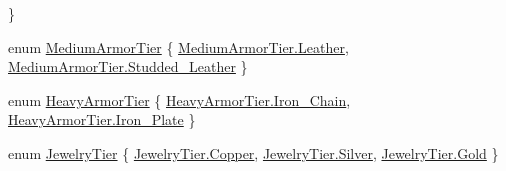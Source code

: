 \begin{DoxyCompactItemize}
 \}
\item 
enum \mbox{\hyperlink{class_base_item_a920c9e47e5258c5bac64842ce8997cb0}{Medium\+Armor\+Tier}} \{ \mbox{\hyperlink{class_base_item_a920c9e47e5258c5bac64842ce8997cb0abdf7ad23e89b55f904bca0304819309e}{Medium\+Armor\+Tier.\+Leather}}, 
\mbox{\hyperlink{class_base_item_a920c9e47e5258c5bac64842ce8997cb0a34833b9352f8ebeef7960b067a6ee001}{Medium\+Armor\+Tier.\+Studded\+\_\+\+Leather}}
 \}
\item 
enum \mbox{\hyperlink{class_base_item_a3d8a039ad76206fc6622908254923b42}{Heavy\+Armor\+Tier}} \{ \mbox{\hyperlink{class_base_item_a3d8a039ad76206fc6622908254923b42ae68b72466d3a9a25070f08e85b67e59d}{Heavy\+Armor\+Tier.\+Iron\+\_\+\+Chain}}, 
\mbox{\hyperlink{class_base_item_a3d8a039ad76206fc6622908254923b42abc164f0b4e865398d61a9bed45eada53}{Heavy\+Armor\+Tier.\+Iron\+\_\+\+Plate}}
 \}
\item 
enum \mbox{\hyperlink{class_base_item_a1c4562ea0ee40255c44724fefee47ad7}{Jewelry\+Tier}} \{ \mbox{\hyperlink{class_base_item_a1c4562ea0ee40255c44724fefee47ad7aa4090ffabdfba53d76b0748a0d87ce21}{Jewelry\+Tier.\+Copper}}, 
\mbox{\hyperlink{class_base_item_a1c4562ea0ee40255c44724fefee47ad7af96e345fdc19cbd4cf15256c251a39a0}{Jewelry\+Tier.\+Silver}}, 
\mbox{\hyperlink{class_base_item_a1c4562ea0ee40255c44724fefee47ad7a9768feb3fdb1f267b06093bc572952dd}{Jewelry\+Tier.\+Gold}}
 \}
\end{DoxyCompactItemize}
